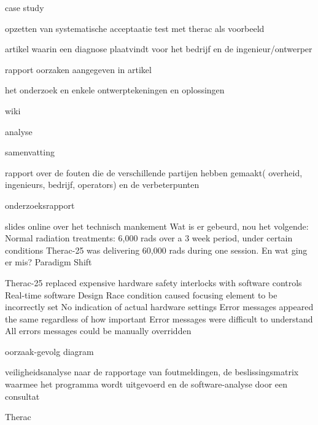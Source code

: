 \cite{huffbrown2004casestudyethicatherac}
case study

\cite{sebowikimedicalradiation}
opzetten van systematische acceptaatie test met therac als voorbeeld

\cite{hsia1995testtherac25}
artikel waarin een diagnose plaatvindt voor het bedrijf en de ingenieur/ontwerper

\cite{magsilvaTheracTesting}
rapport
oorzaken aangegeven in artikel

\cite{chemeuropetherac25}
het onderzoek en enkele ontwerptekeningen en oplossingen

\cite{statsenko10102016Therackillerbug}

\cite{therac25casestudy}

\cite{thomas1994theracinLotos}

\cite{twitter2019programmerbehindtherac}
wiki

\cite{wikibookstherac}
analyse

\cite{bozdagTherac25}
samenvatting


\cite{levesonTurnerTheracAbstract}

rapport over de fouten die de verschillende partijen hebben gemaakt( overheid, ingenieurs, bedrijf, operators) en de verbeterpunten


onderzoeksrapport


slides online over het technisch mankement
Wat is er gebeurd, nou het volgende:
Normal radiation treatments: 6,000 rads over a 3 week period, under certain conditions Therac-25 was delivering 60,000 rads during one session.
En wat ging er mis?
Paradigm Shift

Therac-25 replaced expensive hardware safety interlocks with software controls
Real-time software
Design
Race condition caused focusing element to be incorrectly set
No indication of actual hardware settings
Error messages appeared the same regardless of how important
Error messages were difficult to understand
All errors messages could be manually overridden



oorzaak-gevolg diagram


veiligheidsanalyse naar de rapportage van foutmeldingen, de beslissingsmatrix waarmee het programma wordt uitgevoerd en de software-analyse door een consultat

\cite{stackexchange2021therac25code}



Therac



